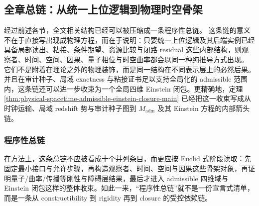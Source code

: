 \subsection{全章总链：从统一上位逻辑到物理时空骨架}\label{subsec:physical-spacetime-skeleton-grand-chain}

经过前述各节，全文相关结构已经可以被压缩成一条程序性总链。
这条链的意义不在于直接写出现成物理方程，而在于说明：只要统一上位逻辑及其后端实例已经具备局部读出、粘接、条件期望、资源比较与闭路 residual 这些内部结构，则观察者、时间、空间、因果、量子相位与时空曲率都会以同一种纯推导方式出现。
它们不是附着在理论之外的物理装饰，而是同一结构在不同表示层上的必然后果。
并且在审计种子、局域 exactness 与粘接证书足以支持全局化的 admissible 范围内，这条链还可以进一步收束为一个全局四维 Einstein 闭包。更精确地，定理 \ref{thm:physical-spacetime-admissible-einstein-closure-main} 已经把这一收束写成从时钟运输、局域 redshift 势与审计种子图到 \(M_{\mathrm{adm}}\) 及其 Einstein 方程的内部箭头链。

\subsubsection{程序性总链}

在方法上，这条总链不应被看成十个并列条目，而更应按 Euclid 式阶段读取：先固定最小接口与允许步骤，再构造观察者、时间、空间与因果这些骨架对象，再证明量子/曲率/传播等刚性与障碍层结果，最后才进入 admissible 四维域与 Einstein 闭包这样的整体收束。如此一来，“程序性总链”就不是一份宣言式清单，而是一条从 constructibility 到 rigidity 再到 closure 的受控依赖链。

